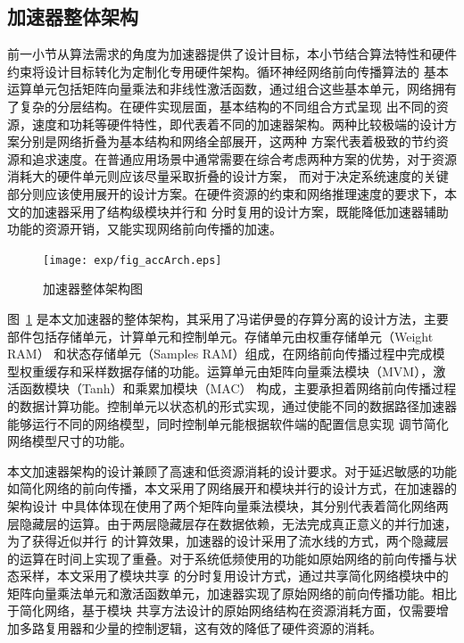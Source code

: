 \subsection{加速器整体架构}
前一小节从算法需求的角度为加速器提供了设计目标，本小节结合算法特性和硬件约束将设计目标转化为定制化专用硬件架构。循环神经网络前向传播算法的
基本运算单元包括矩阵向量乘法和非线性激活函数，通过组合这些基本单元，网络拥有了复杂的分层结构。在硬件实现层面，基本结构的不同组合方式呈现
出不同的资源，速度和功耗等硬件特性，即代表着不同的加速器架构。两种比较极端的设计方案分别是网络折叠为基本结构和网络全部展开，这两种
方案代表着极致的节约资源和追求速度。在普通应用场景中通常需要在综合考虑两种方案的优势，对于资源消耗大的硬件单元则应该尽量采取折叠的设计方案，
而对于决定系统速度的关键部分则应该使用展开的设计方案。在硬件资源的约束和网络推理速度的要求下，本文的加速器采用了结构级模块并行和
分时复用的设计方案，既能降低加速器辅助功能的资源开销，又能实现网络前向传播的加速。
\begin{figure}
	\centering
	\texttt{[image: exp/fig\_accArch.eps]}
	\caption{加速器整体架构图}
	\label{fig:accArch}
\end{figure}

图~\ref{fig:accArch} 是本文加速器的整体架构，其采用了冯诺伊曼的存算分离的设计方法，主要部件包括存储单元，计算单元和控制单元。存储单元由权重存储单元（Weight RAM）
和状态存储单元（Samples RAM）组成，在网络前向传播过程中完成模型权重缓存和采样数据存储的功能。运算单元由矩阵向量乘法模块（MVM），激活函数模块（Tanh）和乘累加模块（MAC）
构成，主要承担着网络前向传播过程的数据计算功能。控制单元以状态机的形式实现，通过使能不同的数据路径加速器能够运行不同的网络模型，同时控制单元能根据软件端的配置信息实现
调节简化网络模型尺寸的功能。

本文加速器架构的设计兼顾了高速和低资源消耗的设计要求。对于延迟敏感的功能如简化网络的前向传播，本文采用了网络展开和模块并行的设计方式，在加速器的架构设计
中具体体现在使用了两个矩阵向量乘法模块，其分别代表着简化网络两层隐藏层的运算。由于两层隐藏层存在数据依赖，无法完成真正意义的并行加速，为了获得近似并行
的计算效果，加速器的设计采用了流水线的方式，两个隐藏层的运算在时间上实现了重叠。对于系统低频使用的功能如原始网络的前向传播与状态采样，本文采用了模块共享
的分时复用设计方式，通过共享简化网络模块中的矩阵向量乘法单元和激活函数单元，加速器实现了原始网络的前向传播功能。相比于简化网络，基于模块
共享方法设计的原始网络结构在资源消耗方面，仅需要增加多路复用器和少量的控制逻辑，这有效的降低了硬件资源的消耗。



